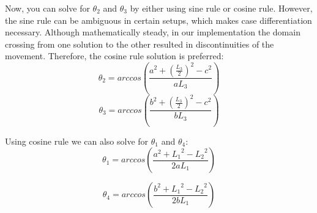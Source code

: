 \documentclass[11pt, oneside]{article}   %
\begin{document}
Now, you can solve for $\theta_2$ and $\theta_3$ by either using sine rule or cosine rule. However, the sine rule can be ambiguous in certain setups, which makes case differentiation necessary. Although mathematically steady, in our implementation the domain crossing from one solution to the other resulted in discontinuities of the movement. Therefore, the cosine rule solution is preferred:
\begin{equation}
\theta_2 = arccos\left(  \frac{a^2 + (\frac{L_3}{2})^2 - c^2}{aL_3} \right)
\label{eqn:theta2}
\end{equation}
\begin{equation}
\theta_3 = arccos\left(  \frac{b^2 + (\frac{L_3}{2})^2 - c^2}{bL_3} \right)
\label{eqn:theta3}
\end{equation}


Using cosine rule we can also solve for $\theta_1$ and $\theta_4$:
\begin{equation}
\theta_1 = arccos\left(  \frac{a^2 + {L_1}^2 - {L_2}^2}{2aL_1} \right)
\label{eqn:theta1}
\end{equation}

\begin{equation}
\theta_4 = arccos\left(  \frac{b^2 + {L_1}^2 - {L_2}^2}{2bL_1} \right)
\label{eqn:theta4}
\end{equation}
\end{document}
